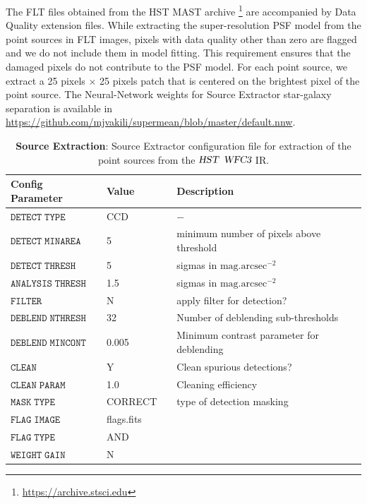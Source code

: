 The FLT files obtained from the HST MAST archive \footnote{\url{https://archive.stsci.edu}} are accompanied by Data Quality extension files. 
While extracting the super-resolution PSF model from the point sources in FLT images, pixels with data quality other than zero are flagged and we do not include them in model fitting. This requirement ensures that the damaged pixels do not contribute to the PSF model. For each point source, we extract a 25 pixels $\times$ 25 pixels patch that is centered on the brightest pixel of the point source. The Neural-Network weights for Source Extractor star-galaxy separation is available in \url{https://github.com/mjvakili/supermean/blob/master/default.nnw}.

\clearpage

\begin{table}
\begin{center}
  \label{tab:sextractor}
  \caption{{\bf Source Extraction}: Source Extractor configuration file for extraction of the point sources from the ${\textsl{HST}}$ ${\textsl{WFC3}}$ IR.}
\begin{tabular}{@{}lllll}
\\ \hline 
    Config Parameter & Value & &  Description\\ \hline
  $\mathtt{DETECT \; TYPE}$ & CCD & &  $-$\\
  $\mathtt{DETECT \; MINAREA}$ & 5 & &  minimum number of pixels above threshold\\
  $\mathtt{DETECT \; THRESH}$ & 5 & &  sigmas in $\mathrm{mag.arcsec}^{-2}$ \\
  $\mathtt{ANALYSIS \; THRESH}$ & 1.5 & & sigmas in $\mathrm{mag.arcsec}^{-2}$  \\
  $\mathtt{FILTER}$ & N & &  apply filter for detection?\\ 
  $\mathtt{DEBLEND \;  NTHRESH}$ & 32 & &  Number of deblending sub-thresholds \\
  $\mathtt{DEBLEND \; MINCONT}$ & 0.005 & &  Minimum contrast parameter for deblending \\
  $\mathtt{CLEAN}$ & Y & &  Clean spurious detections?\\
  $\mathtt{CLEAN \; PARAM}$ & 1.0 & & Cleaning efficiency \\
  $\mathtt{MASK \; TYPE}$ & CORRECT & &  type of detection masking \\
  $\mathtt{FLAG \; IMAGE}$ & flags.fits & &   \\
  $\mathtt{FLAG \; TYPE}$ & AND & &   \\
  $\mathtt{WEIGHT \; GAIN}$ & N & &   \\

\end{tabular}
\end{center}
\end{table}
